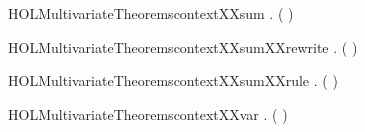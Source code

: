 \newcommand{\HOLMultivariateTheoremscontextXXrules}{\UseVerbatim{HOLMultivariateTheoremscontextXXrules}}
\begin{SaveVerbatim}{HOLMultivariateTheoremscontextXXsum}
\HOLTokenTurnstile{} \HOLSymConst{\HOLTokenForall{}}  .
         ( \HOLSymConst{\ensuremath{+}} ) \HOLSymConst{\HOLTokenImp{}}    \HOLSymConst{\HOLTokenConj{}}   
\end{SaveVerbatim}
\newcommand{\HOLMultivariateTheoremscontextXXsum}{\UseVerbatim{HOLMultivariateTheoremscontextXXsum}}
\begin{SaveVerbatim}{HOLMultivariateTheoremscontextXXsumXXrewrite}
\HOLTokenTurnstile{} \HOLSymConst{\HOLTokenForall{}}  .
         ( \HOLSymConst{\ensuremath{+}} ) \HOLSymConst{\HOLTokenEquiv{}}    \HOLSymConst{\HOLTokenConj{}}   
\end{SaveVerbatim}
\newcommand{\HOLMultivariateTheoremscontextXXsumXXrewrite}{\UseVerbatim{HOLMultivariateTheoremscontextXXsumXXrewrite}}
\begin{SaveVerbatim}{HOLMultivariateTheoremscontextXXsumXXrule}
\HOLTokenTurnstile{} \HOLSymConst{\HOLTokenForall{}}  .
          \HOLSymConst{\HOLTokenConj{}}    \HOLSymConst{\HOLTokenImp{}}   ( \HOLSymConst{\ensuremath{+}} )
\end{SaveVerbatim}
\newcommand{\HOLMultivariateTheoremscontextXXsumXXrule}{\UseVerbatim{HOLMultivariateTheoremscontextXXsumXXrule}}
\begin{SaveVerbatim}{HOLMultivariateTheoremscontextXXvar}
\HOLTokenTurnstile{} \HOLSymConst{\HOLTokenForall{}} .   ( )
\end{SaveVerbatim}
